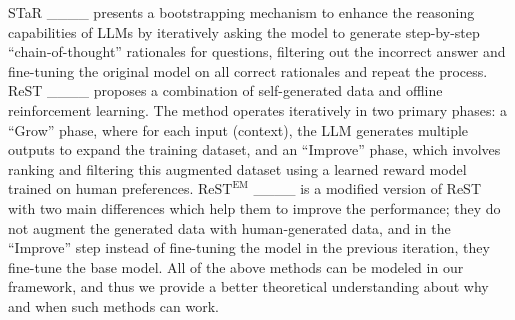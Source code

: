 STaR ____ presents a bootstrapping mechanism to enhance the reasoning capabilities of LLMs by iteratively asking the model to generate step-by-step ``chain-of-thought'' rationales for questions, filtering out the incorrect answer and fine-tuning the original model on all correct rationales and repeat the process. ReST ____ proposes a combination of self-generated data and offline reinforcement learning. The method operates iteratively in two primary phases: a ``Grow'' phase, where for each input (context), the LLM generates multiple outputs to expand the training dataset, and an ``Improve'' phase, which involves ranking and filtering this augmented dataset using a learned reward model trained on human preferences. $\text{ReST}^\text{EM}$ ____ is a modified version of ReST with two main differences which help them to improve the performance; they do not augment the generated data with human-generated data, and in the ``Improve'' step instead of fine-tuning the model in the previous iteration, they fine-tune the base model. All of the above methods can be modeled in our framework, and thus we provide a better theoretical understanding about why and when such methods can work. %